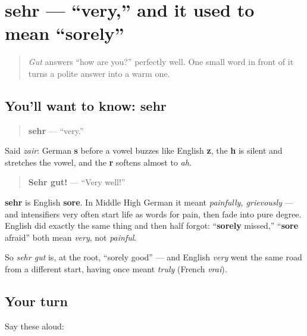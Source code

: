 \section[sehr]{sehr — \textquotedblleft{}very,\textquotedblright{} and it used to mean \textquotedblleft{}sorely\textquotedblright{}}

\label{lesson:GE-C03-sehr}



\begin{quote}
\emph{Gut} answers \textquotedblleft{}how are you?\textquotedblright{} perfectly well. One small word in front of it turns a polite answer into a warm one.
\end{quote}

\subsection*{You'll want to know: sehr}
\begin{quote}
\textbf{sehr} — \textquotedblleft{}very.\textquotedblright{}
\end{quote}

Said \emph{zair}: German \textbf{s} before a vowel buzzes like English \textbf{z}, the \textbf{h} is silent and stretches the vowel, and the \textbf{r} softens almost to \emph{ah}.

\begin{quote}
\textbf{Sehr gut!} — \textquotedblleft{}Very well!\textquotedblright{}
\end{quote}

\begin{cousinweb}
\textbf{sehr} is English \textbf{sore}. In Middle High German it meant \emph{painfully, grievously} — and intensifiers very often start life as words for pain, then fade into pure degree. English did exactly the same thing and then half forgot: \textquotedblleft{}\textbf{sorely} missed,\textquotedblright{} \textquotedblleft{}\textbf{sore} afraid\textquotedblright{} both mean \emph{very}, not \emph{painful}.

So \emph{sehr gut} is, at the root, \textquotedblleft{}sorely good\textquotedblright{} — and English \emph{very} went the same road from a different start, having once meant \emph{truly} (French \emph{vrai}).
\end{cousinweb}

\subsection*{Your turn}
Say these aloud:

